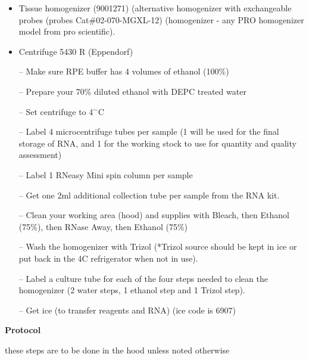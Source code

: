 \documentclass[11pt, oneside]{article}
\begin{document}
			
			\begin{itemize}
				\itemsep0mm
				\item Tissue homogenizer (9001271) (alternative homogenizer with exchangeable probes (probes Cat\#02-070-MGXL-12) (homogenizer 				- any PRO homogenizer model from pro scientific). 
				\item Centrifuge 5430 R (Eppendorf)
			\end{itemize}
		
		\vspace{5mm}
		
				
			\begin{itemize}
				\itemsep0em
				\item[--] Make sure RPE buffer has 4 volumes of ethanol (100\%)
				\item[--] Prepare your 70\% diluted ethanol with DEPC treated water
				\item[--] Set centrifuge to 4$^{\sim}$C
				\item[--] Label 4 microcentrifuge tubes per sample (1 will be used for the final storage of RNA, and 1 for the working stock to use for 					quantity and quality assessment)
				\item[--] Label 1 RNeasy Mini spin column per sample
				\item[--] Get one 2ml additional collection tube per sample from the RNA kit. 
				\item[--] Clean your working area (hood) and supplies with Bleach, then Ethanol (75\%), then RNase Away, then Ethanol (75\%)
				\item[--] Wash the homogenizer with Trizol (*Trizol source should be kept in ice or put back in the 4C refrigerator when not in use). 
				\item[--] Label a culture tube for each of the four steps needed to clean the homogenizer (2 water steps, 1 ethanol step and 1 Trizol 					step). 
				\item[--] Get ice (to transfer reagents and RNA) (ice code is 6907)
			\end{itemize}
				
			\vspace{3mm}
			
		{\bf Protocol}
			
		\noindent *these steps are to be done in the hood unless noted otherwise
	
\end{document}
